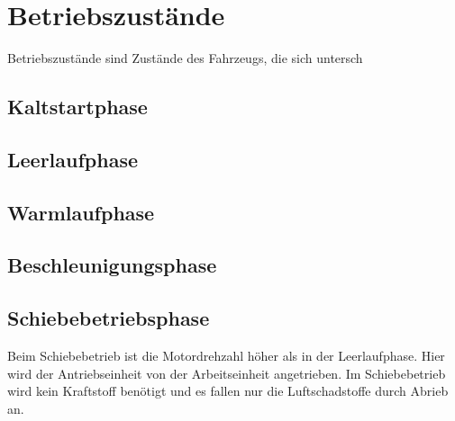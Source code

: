 \section{Betriebszustände}
Betriebszustände sind Zustände des Fahrzeugs, die sich untersch
\subsection{Kaltstartphase}
\subsection{Leerlaufphase}
\subsection{Warmlaufphase}
\subsection{Beschleunigungsphase}
\subsection{Schiebebetriebsphase}
Beim Schiebebetrieb ist die Motordrehzahl höher als in der Leerlaufphase.
Hier wird der Antriebseinheit von der Arbeitseinheit angetrieben.
Im Schiebebetrieb wird kein Kraftstoff benötigt und es fallen nur die Luftschadstoffe durch Abrieb an.